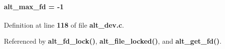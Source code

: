 \paragraph[{alt\+\_\+max\+\_\+fd}]{ alt\+\_\+max\+\_\+fd = -\/1}\label{alt__dev_8c_aefa50a1243bc074834e3140d00a7eca0}


Definition at line {\bf 118} of file {\bf alt\+\_\+dev.\+c}.



Referenced by {\bf alt\+\_\+fd\+\_\+lock()}, {\bf alt\+\_\+file\+\_\+locked()}, and {\bf alt\+\_\+get\+\_\+fd()}.


